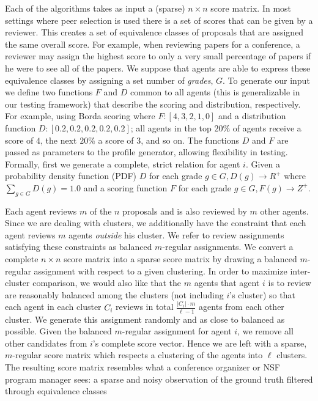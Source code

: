 \documentclass[letterpaper]{article}
\begin{document}
Each of the algorithms takes as input a (sparse) $n \times n$ score matrix.
In most settings where peer selection is used there is a set of scores that can be given by a reviewer. This creates a set of equivalence classes of proposals that are assigned the same overall score. For example, when reviewing papers for a conference, a reviewer may assign the highest score to only a very small percentage of papers if he were to see all of the papers. We suppose that agents are able to express these equivalence classes by assigning a set number of \emph{grades}, $G$. %
To generate our input we define two functions $F$ and $D$ common to all agents (this is generalizable in our testing framework) that describe the scoring and distribution, respectively. For example, using Borda scoring where $F:[4, 3, 2, 1, 0]$ and a distribution function $D: [0.2, 0.2, 0.2, 0.2, 0.2]$; all agents in the top $20\%$ of agents receive a score of $4$, the next $20\%$ a score of $3$, and so on. The functions $D$ and $F$ are passed as parameters to the profile generator, allowing flexibility in testing.
Formally, first we generate a complete, strict relation for agent $i$. Given a probability density function (PDF) $D$ for each grade $g\in G, D(g) \rightarrow R^+$ where $\sum_{g \in G} D(g) = 1.0$ and a scoring function $F$ for each grade $g \in G, F(g) \rightarrow Z^+$. 

Each agent reviews $m$ of the $n$ proposals and is also reviewed by $m$ other agents. Since we are dealing with clusters, we additionally have the constraint that each agent reviews $m$ agents \emph{outside} his cluster. We refer to review assignments satisfying these constraints as balanced $m$-regular assignments. 
We convert a complete $n \times n$ score matrix into a sparse score matrix by drawing a balanced $m$-regular assignment with respect to a given clustering. In order to maximize inter-cluster comparison, we would also like that the $m$ agents that agent $i$ is to review are reasonably balanced among the clusters (not including $i$'s cluster) so that each agent in each cluster $C_i$ reviews in total $\frac{|C_i| \cdot m}{\ell -1}$ agents from each other cluster. We generate this assignment randomly and as close to balanced as possible.
Given the balanced $m$-regular assignment for agent $i$, we remove all other candidates from $i$'s complete score vector. Hence we are left with a sparse, $m$-regular score matrix which respects a clustering of the agents into $\ell$ clusters. The resulting score matrix resembles what a conference organizer or NSF program manager sees: a sparse and noisy observation of the ground truth filtered through equivalence classes
\end{document}
